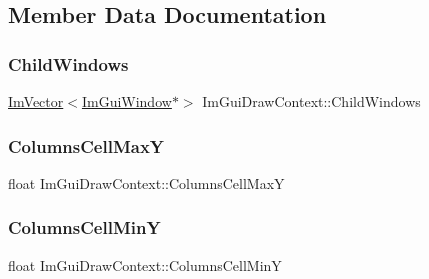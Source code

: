 \subsection{Member Data Documentation}
\hypertarget{struct_im_gui_draw_context_a70dc80b69c2a4e5fae4009300fe525a5}{}\label{struct_im_gui_draw_context_a70dc80b69c2a4e5fae4009300fe525a5} 
\subsubsection{\texorpdfstring{Child\+Windows}{ChildWindows}}
{\footnotesize\ttfamily \hyperlink{class_im_vector}{Im\+Vector}$<$\hyperlink{struct_im_gui_window}{Im\+Gui\+Window}$\ast$$>$ Im\+Gui\+Draw\+Context\+::\+Child\+Windows}

\hypertarget{struct_im_gui_draw_context_a91c90b98539dc2b1522dd3f7bafa3b21}{}\label{struct_im_gui_draw_context_a91c90b98539dc2b1522dd3f7bafa3b21} 
\subsubsection{\texorpdfstring{Columns\+Cell\+MaxY}{ColumnsCellMaxY}}
{\footnotesize\ttfamily float Im\+Gui\+Draw\+Context\+::\+Columns\+Cell\+MaxY}

\hypertarget{struct_im_gui_draw_context_a675eb10cf0c56322f8e9a6c40e33a7ea}{}\label{struct_im_gui_draw_context_a675eb10cf0c56322f8e9a6c40e33a7ea} 
\subsubsection{\texorpdfstring{Columns\+Cell\+MinY}{ColumnsCellMinY}}
{\footnotesize\ttfamily float Im\+Gui\+Draw\+Context\+::\+Columns\+Cell\+MinY}

\hypertarget{struct_im_gui_draw_context_ab068622174203ba86e835980cad066b6}{}\label{struct_im_gui_draw_context_ab068622174203ba86e835980cad066b6} 
